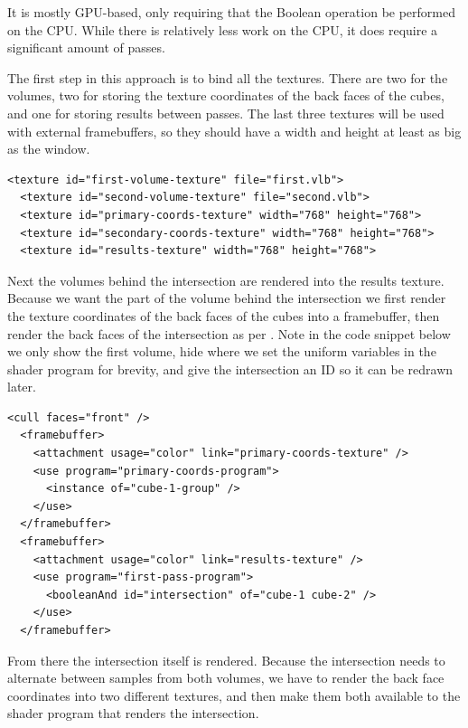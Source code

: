 \documentclass{article}
\begin{document}
It is mostly GPU-based, only requiring that the Boolean operation be performed
on the CPU.  While there is relatively less work on the CPU, it does require a
significant amount of passes.

The first step in this approach is to bind all the textures.  There are two for
the volumes, two for storing the texture coordinates of the back faces of the
cubes, and one for storing results between passes.  The last three textures will
be used with external framebuffers, so they should have a width and height at
least as big as the window.

\begin{Verbatim}[fontsize=\small]
  <texture id="first-volume-texture" file="first.vlb">
  <texture id="second-volume-texture" file="second.vlb">
  <texture id="primary-coords-texture" width="768" height="768">
  <texture id="secondary-coords-texture" width="768" height="768">
  <texture id="results-texture" width="768" height="768">
\end{Verbatim}

Next the volumes behind the intersection are rendered into the results texture.
Because we want the part of the volume behind the intersection we first render
the texture coordinates of the back faces of the cubes into a framebuffer, then
render the back faces of the intersection as per \cite{Kruger03}.  Note in the code
snippet below we only show the first volume, hide where we set the uniform
variables in the shader program for brevity, and give the intersection an ID so
it can be redrawn later.

\begin{Verbatim}[fontsize=\small]
  <cull faces="front" />
  <framebuffer>
    <attachment usage="color" link="primary-coords-texture" />
    <use program="primary-coords-program">
      <instance of="cube-1-group" />
    </use>
  </framebuffer>
  <framebuffer>
    <attachment usage="color" link="results-texture" />
    <use program="first-pass-program">
      <booleanAnd id="intersection" of="cube-1 cube-2" />
    </use>
  </framebuffer>
\end{Verbatim}

From there the intersection itself is rendered.  Because the intersection needs
to alternate between samples from both volumes, we have to render the back face
coordinates into two different textures, and then make them both available to
the shader program that renders the intersection.
\end{document}
